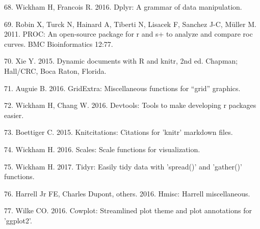 \documentclass[12pt,]{article}
\begin{document}
\hypertarget{ref-dplyr}{}
68. Wickham H, Francois R. 2016. Dplyr: A grammar of data manipulation.

\hypertarget{ref-pROC}{}
69. Robin X, Turck N, Hainard A, Tiberti N, Lisacek F, Sanchez J-C,
Müller M. 2011. PROC: An open-source package for r and s+ to analyze and
compare roc curves. BMC Bioinformatics 12:77.

\hypertarget{ref-knitr2015}{}
70. Xie Y. 2015. Dynamic documents with R and knitr, 2nd ed. Chapman;
Hall/CRC, Boca Raton, Florida.

\hypertarget{ref-gridExtra}{}
71. Auguie B. 2016. GridExtra: Miscellaneous functions for ``grid''
graphics.

\hypertarget{ref-devtools}{}
72. Wickham H, Chang W. 2016. Devtools: Tools to make developing r
packages easier.

\hypertarget{ref-knitcitations}{}
73. Boettiger C. 2015. Knitcitations: Citations for 'knitr' markdown
files.

\hypertarget{ref-scales}{}
74. Wickham H. 2016. Scales: Scale functions for visualization.

\hypertarget{ref-tidyr}{}
75. Wickham H. 2017. Tidyr: Easily tidy data with 'spread()' and
'gather()' functions.

\hypertarget{ref-Hmisc}{}
76. Harrell Jr FE, Charles Dupont, others. 2016. Hmisc: Harrell
miscellaneous.

\hypertarget{ref-cowplot}{}
77. Wilke CO. 2016. Cowplot: Streamlined plot theme and plot annotations
for 'ggplot2'.
\end{document}

